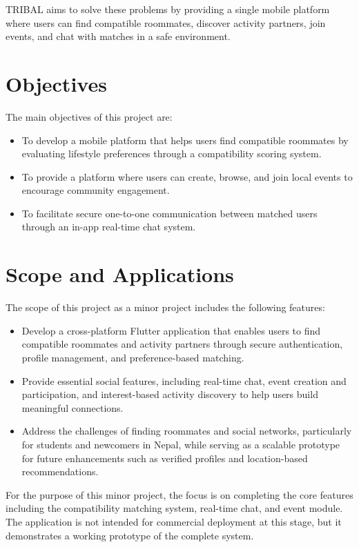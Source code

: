TRIBAL aims to solve these problems by providing a single mobile platform where users can find compatible roommates, discover activity partners, join events, and chat with matches in a safe environment.

 \section{Objectives}
 The main objectives of this project are:
\begin{itemize}
  \item To develop a mobile platform that helps users find compatible roommates by evaluating lifestyle preferences through a compatibility scoring system.
  \item To provide a platform where users can create, browse, and join local events to encourage community engagement.
  \item To facilitate secure one-to-one communication between matched users through an in-app real-time chat system.
\end{itemize}

 \section{Scope and Applications}
 
The scope of this project as a minor project includes the following features:
\begin{itemize}


\item Develop a cross-platform Flutter application that enables users to find compatible roommates and activity partners through secure authentication, profile management, and preference-based matching.
\item Provide essential social features, including real-time chat, event creation and participation, and interest-based activity discovery to help users build meaningful connections.
\item Address the challenges of finding roommates and social networks, particularly for students and newcomers in Nepal, while serving as a scalable prototype for future enhancements such as verified profiles and location-based recommendations.

\end{itemize}

For the purpose of this minor project, the focus is on completing the core features
including the compatibility matching system, real-time chat, and event module. The
application is not intended for commercial deployment at this stage, but it demonstrates a
working prototype of the complete system.